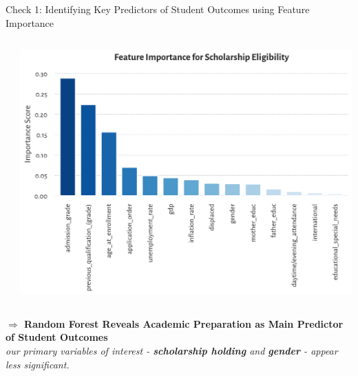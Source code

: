 \documentclass[aspectratio=169]{beamer}
\begin{document}
\begin{frame}{Check 1: Identifying Key Predictors of Student Outcomes using Feature Importance}
\begin{columns}
\begin{column}{0.5\textwidth}
\end{column}
\begin{column}{0.5\textwidth}
\centering
\includegraphics[width=\linewidth]{Tex_Pictures/feature_scholarship}
\end{column}
\end{columns}
\vspace{8pt}
\textbf{$\Rightarrow$ Random Forest Reveals Academic Preparation as Main Predictor of Student Outcomes} \\
\textit{our primary variables of interest - \textbf{scholarship holding} and \textbf{gender} - appear less significant.}

\end{frame}
\end{document}
